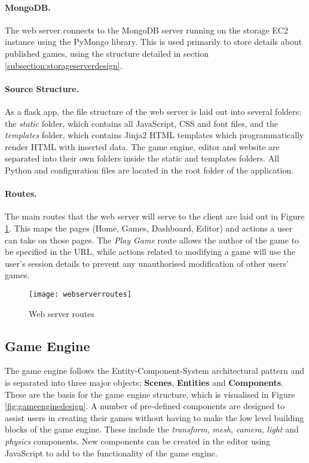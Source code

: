 	\paragraph{MongoDB.}
	The web server connects to the MongoDB server running on the storage EC2 instance using the PyMongo library. This is used primarily to store details about published games, using the structure detailed in section \ref{subsection:storageserverdesign}.

	\paragraph{Source Structure.}
	As a flask app, the file structure of the web server is laid out into several folders; the \emph{static} folder, which contains all JavaScript, CSS and font files, and the \emph{templates} folder, which contains Jinja2 HTML templates which programmatically render HTML with inserted data.\cite{jinja2} The game engine, editor and website are separated into their own folders inside the static and templates folders. All Python and configuration files are located in the root folder of the application.

	\paragraph{Routes.}
	The main routes that the web server will serve to the client are laid out in Figure \ref{fig:webserverroutes}. This maps the pages (Home, Games, Dashboard, Editor) and actions a user can take on those pages. The \emph{Play Game} route allows the author of the game to be specified in the URL, while actions related to modifying a game will use the user's session details to prevent any unauthorised modification of other users' games.

	\begin{figure}[h]
		\centering
		\texttt{[image: webserverroutes]}
		\caption{Web server routes}
		\label{fig:webserverroutes}
	\end{figure}

	\subsection{Game Engine}
	The game engine follows the Entity-Component-System architectural pattern and is separated into three major objects; \textbf{Scenes}, \textbf{Entities} and \textbf{Components}. These are the basis for the game engine structure, which is visualised in Figure \ref{fig:gameenginedesign}. A number of pre-defined components are designed to assist users in creating their games without having to make the low level building blocks of the game engine. These include the \emph{transform}, \emph{mesh}, \emph{camera}, \emph{light} and \emph{physics} components. New components can be created in the editor using JavaScript to add to the functionality of the game engine.

